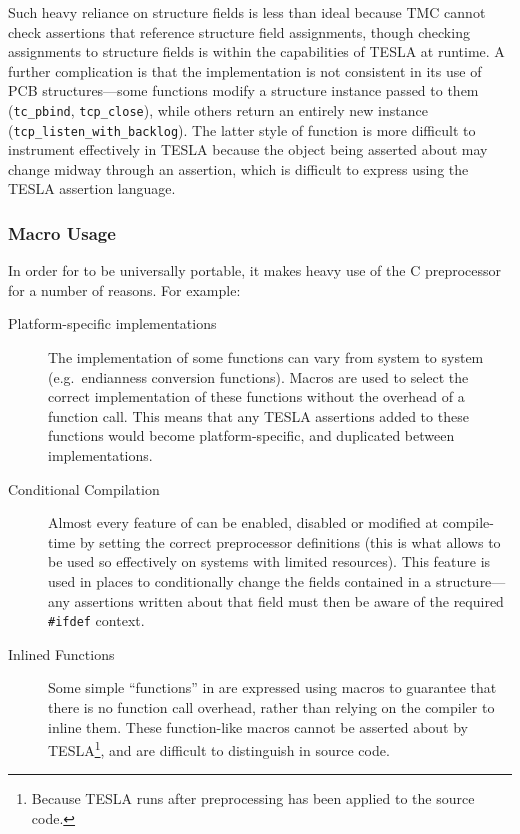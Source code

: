 Such heavy reliance on structure fields is less than ideal because TMC cannot
check assertions that reference structure field assignments, though checking
assignments to structure fields is within the capabilities of TESLA at runtime.
A further complication is that the implementation is not consistent in its use
of PCB structures---some functions modify a structure instance passed to them
(\texttt{tc_pbind}, \texttt{tcp_close}), while others return an
entirely new instance (\texttt{tcp_listen_with_backlog}). The latter
style of function is more difficult to instrument effectively in TESLA because
the object being asserted about may change midway through an assertion, which is
difficult to express using the TESLA assertion language.

\subsubsection{Macro Usage}

In order for \lwip{} to be universally portable, it makes heavy use of the
C preprocessor for a number of reasons. For example:
\begin{description}
  \item[Platform-specific implementations] The implementation of some
  functions can vary from system to system (e.g.\ endianness conversion
  functions). Macros are used to select the correct implementation of
  these functions without the overhead of a function call. This means
  that any TESLA assertions added to these functions would become
  platform-specific, and duplicated between implementations.

  \item[Conditional Compilation] Almost every feature of \lwip{} can be
  enabled, disabled or modified at compile-time by setting the correct
  preprocessor definitions (this is what allows \lwip{} to be used so
  effectively on systems with limited resources). This feature
  is used in places to conditionally change the fields contained in a
  structure---any assertions written about that field must then be aware
  of the required \texttt{#ifdef} context.

  \item[Inlined Functions] Some simple ``functions'' in \lwip{} are expressed using
    macros to guarantee that there is no function call overhead, rather than
    relying on the compiler to inline them. These function-like macros cannot be
    asserted about by TESLA\footnote{Because TESLA runs after preprocessing has
    been applied to the source code.}, and are difficult to distinguish in source code.
\end{description}

